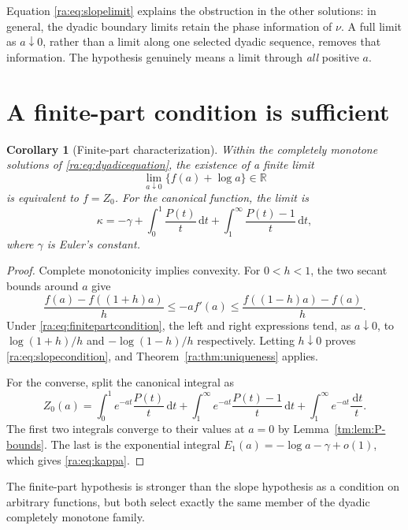 \documentclass[11pt,a4paper,oneside,openany]{book}
\numberwithin{equation}{chapter}
\newtheorem{corollary}[theorem]{Corollary}
\theoremstyle{definition}
\theoremstyle{remark}
\newcommand{\R}{\mathbb R}
\newcommand{\dd}{\,\mathrm d}
\begin{document}
Equation \eqref{ra:eq:slopelimit} explains the obstruction in the other
solutions: in general, the dyadic boundary limits retain the phase
information of $\nu$. A full limit as $a\downarrow0$, rather than a
limit along one selected dyadic sequence, removes that information.
The hypothesis genuinely means a limit through \emph{all} positive $a$.

\section{A finite-part condition is sufficient}
\begin{corollary}[Finite-part characterization]\label{ra:cor:finitepart}
Within the completely monotone solutions of \eqref{ra:eq:dyadicequation},
the existence of a finite limit
\begin{equation}\label{ra:eq:finitepartcondition}
 \lim_{a\downarrow0}\{f(a)+\log a\}\in\R
\end{equation}
is equivalent to $f=Z_0$. For the canonical function, the limit is
\begin{equation}\label{ra:eq:kappa}
 \kappa=-\gamma+
     \int_0^1\frac{P(t)}t\dd t+
     \int_1^\infty\frac{P(t)-1}t\dd t,
\end{equation}
where $\gamma$ is Euler's constant.
\end{corollary}
\begin{proof}
Complete monotonicity implies convexity. For $0<h<1$, the two secant
bounds around $a$ give
\begin{equation}\label{ra:eq:convexbounds}
 \frac{f(a)-f((1+h)a)}h
 \le -af'(a)
 \le\frac{f((1-h)a)-f(a)}h.
\end{equation}
Under \eqref{ra:eq:finitepartcondition}, the left and right expressions tend,
as $a\downarrow0$, to $\log(1+h)/h$ and $-\log(1-h)/h$ respectively.
Letting $h\downarrow0$ proves \eqref{ra:eq:slopecondition}, and
Theorem~\ref{ra:thm:uniqueness} applies.

For the converse, split the canonical integral as
\[
 Z_0(a)=\int_0^1e^{-at}\frac{P(t)}t\dd t
       +\int_1^\infty e^{-at}\frac{P(t)-1}t\dd t
       +\int_1^\infty e^{-at}\frac{\dd t}{t}.
\]
The first two integrals converge to their values at $a=0$ by
Lemma~\ref{tm:lem:P-bounds}. The last is the exponential integral
$E_1(a)=-\log a-\gamma+o(1)$, which gives \eqref{ra:eq:kappa}.
\end{proof}

The finite-part hypothesis is stronger than the slope hypothesis as a
condition on arbitrary functions, but both select exactly the same member
of the dyadic completely monotone family.
\end{document}
